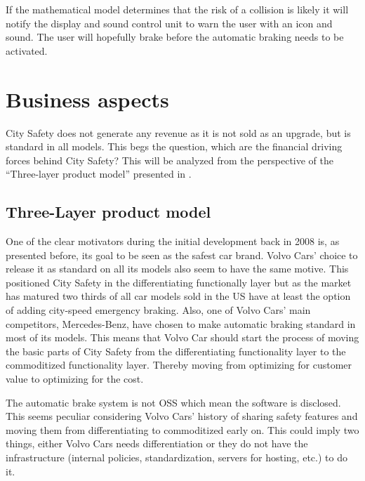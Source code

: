 \documentclass[conference]{IEEEtran}
\begin{document}
If the mathematical model determines that the risk of a collision is likely it will notify the display and sound control unit to warn the user with an icon and sound. The user will hopefully brake before the automatic braking needs to be activated. \cite{CitySafetyDefinition}

\section{Business aspects}
City Safety does not generate any revenue as it is not sold as an upgrade, but is standard in all models. This begs the question, which are the financial driving forces behind City Safety? This will be analyzed from the perspective of the ``Three-layer product model'' presented in \cite{TeLESM}.

\subsection{Three-Layer product model}
One of the clear motivators during the initial development back in 2008 is, as presented before, its goal to be seen as the safest car brand. Volvo Cars' choice to release it as standard on all its models also seem to have the same motive. This positioned City Safety in the differentiating functionally layer but as the market has matured two thirds of all car models sold in the US have at least the option of adding city-speed emergency braking. Also, one of Volvo Cars' main competitors, Mercedes-Benz, have chosen to make automatic braking standard in most of its models.  \cite{AEBStatistics} This means that Volvo Car should start the process of moving the basic parts of City Safety from the differentiating functionality layer to the commoditized functionality layer. Thereby moving from optimizing for customer value to optimizing for the cost.

The automatic brake system is not OSS which mean the software is disclosed. This seems peculiar considering Volvo Cars' history of sharing safety features and moving them from differentiating to commoditized early on. This could imply two things, either Volvo Cars needs differentiation or they do not have the infrastructure (internal policies, standardization, servers for hosting, etc.) to do it.
\end{document}
